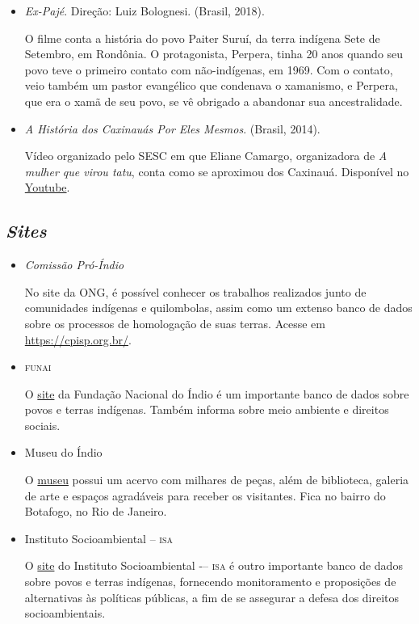 \documentclass[11pt]{extarticle}
\begin{document}
\begin{itemize}
\item \textit{Ex-Pajé}. Direção: Luiz Bolognesi. (Brasil, 2018).

O filme conta a história do povo Paiter Suruí, da terra indígena Sete de Setembro, em Rondônia. O protagonista, Perpera, tinha 20 anos quando seu povo teve o primeiro contato com não-indígenas, em 1969. Com o contato, veio também um pastor evangélico que condenava o xamanismo, e Perpera, que era o xamã de seu povo, se vê obrigado a abandonar sua ancestralidade.

\item \textit{A História dos Caxinauás Por Eles Mesmos}. (Brasil, 2014).

Vídeo organizado pelo SESC em que Eliane Camargo, organizadora de \textit{A mulher que virou tatu}, conta como se aproximou dos Caxinauá. Disponível no \href{https://youtu.be/80Wip9XFtMU}{Youtube}.

\end{itemize}

\subsection{\emph{Sites}}

\begin{itemize}

\item \textit{Comissão Pró-Índio}

No site da ONG, é possível conhecer os trabalhos realizados junto de comunidades indígenas e quilombolas, assim como um extenso banco de dados sobre os processos de homologação de suas terras. Acesse em \url{https://cpisp.org.br/}.
\item \textsc{funai}

O \href{http://www.gov.br/funai}{site} da Fundação Nacional do Índio é um importante banco de dados sobre povos e terras indígenas. Também informa sobre meio ambiente e direitos sociais.

\item Museu do Índio

O \href{http://www.museudoindio.gov.br/}{museu} possui um acervo com milhares de peças, além de biblioteca, galeria de arte e espaços agradáveis para receber os visitantes. Fica no bairro do Botafogo, no Rio de Janeiro.

\item Instituto Socioambiental -- \textsc{isa}

O \href{https://www.socioambiental.org/pt-br}{site} do Instituto Socioambiental -– \textsc{isa} é outro importante banco de dados 
sobre povos e terras indígenas, fornecendo monitoramento e proposições de alternativas às políticas públicas, a fim de se assegurar a defesa dos direitos socioambientais. 

\end{itemize}
\end{document}
